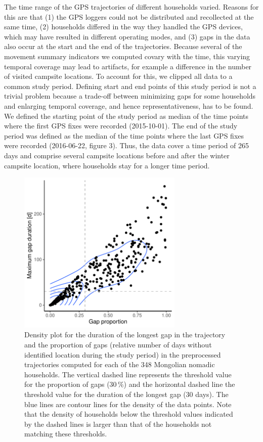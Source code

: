 \documentclass[]{elsarticle} %
\begin{document}
The time range of the GPS trajectories of different households varied.
Reasons for this are that (1) the GPS loggers could not be distributed
and recollected at the same time, (2) households differed in the way
they handled the GPS devices, which may have resulted in different
operating modes, and (3) gaps in the data also occur at the start and
the end of the trajectories. Because several of the movement summary
indicators we computed covary with the time, this varying temporal
coverage may lead to artifacts, for example a difference in the number
of visited campsite locations. To account for this, we clipped all data
to a common study period. Defining start and end points of this study
period is not a trivial problem because a trade-off between minimizing
gaps for some households and enlarging temporal coverage, and hence
representativeness, has to be found. We defined the starting point of
the study period as median of the time points where the first GPS fixes
were recorded (2015-10-01). The end of the study period was defined as
the median of the time points where the last GPS fixes were recorded
(2016-06-22, figure 3). Thus, the data cover a time period of 265 days
and comprise several campsite locations before and after the winter
campsite location, where households stay for a longer time period.

\begin{figure}[H]

{\centering \includegraphics[width=0.7\textwidth]{../figures/gap-filtering-study-period-plot1-1} 

}

\caption{Density plot for the duration of the longest gap in the trajectory and the proportion of gaps (relative number of days without identified location during the study period) in the preprocessed trajectories computed for each of the 348 Mongolian nomadic households. The vertical dashed line represents the threshold value for the proportion of gaps (30\,\%) and the horizontal dashed line the threshold value for the duration of the longest gap (30 days). The blue lines are contour lines for the density of the data points. Note that the density of households below the threshold values indicated by the dashed lines is larger than that of the households not matching these thresholds.\label{fig:gap_filtering_study_period_plot1}}\label{fig:gap-filtering-study-period-plot1}
\end{figure}
\end{document}
